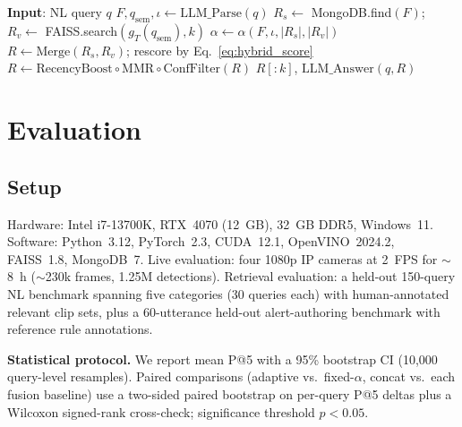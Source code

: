﻿\documentclass[conference]{IEEEtran}
\theoremstyle{definition}
\begin{document}
\begin{algorithm}[H]
\caption{NL query resolution using Eqs.~\eqref{eq:adaptive_alpha},~\eqref{eq:fusion}.}
\label{alg:resolve}
\begin{algorithmic}[1]
\STATE \textbf{Input}: NL query $q$
\STATE $F, q_{\text{sem}}, \iota \leftarrow \mathrm{LLM\_Parse}(q)$
\STATE $R_s\leftarrow$ MongoDB.find$(F)$; $R_v\leftarrow$ FAISS.search$(g_T(q_{\text{sem}}),k)$ 
\STATE $\alpha\leftarrow \alpha(F,\iota,|R_s|,|R_v|)$ 
\STATE $R\leftarrow \mathrm{Merge}(R_s,R_v)$; rescore by Eq.~\eqref{eq:hybrid_score}
\STATE $R\leftarrow \mathrm{RecencyBoost}\circ\mathrm{MMR}\circ\mathrm{ConfFilter}(R)$
\RETURN $R[:k]$, $\mathrm{LLM\_Answer}(q,R)$
\end{algorithmic}
\end{algorithm}

\section{Evaluation}\label{sec:eval}

\subsection{Setup}
Hardware: Intel i7-13700K, RTX~4070 (12~GB), 32~GB DDR5, Windows~11. Software: Python~3.12, PyTorch~2.3, CUDA~12.1, OpenVINO~2024.2, FAISS~1.8, MongoDB~7. Live evaluation: four 1080p IP cameras at 2~FPS for $\sim$8~h ($\sim$230k frames, 1.25M detections). Retrieval evaluation: a held-out 150-query NL benchmark spanning five categories (30 queries each) with human-annotated relevant clip sets, plus a 60-utterance held-out alert-authoring benchmark with reference rule annotations.

\textbf{Statistical protocol.} We report mean P@5 with a 95\% bootstrap CI (10{,}000 query-level resamples). Paired comparisons (adaptive vs.\ fixed-$\alpha$, concat vs.\ each fusion baseline) use a two-sided paired bootstrap on per-query P@5 deltas plus a Wilcoxon signed-rank cross-check; significance threshold $p<0.05$.
\end{document}
